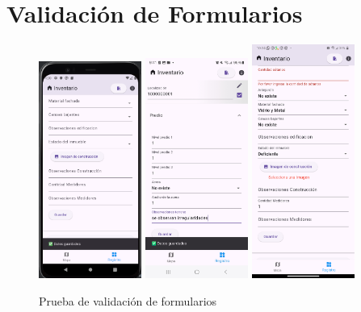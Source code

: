 \section{Validación de Formularios}
\begin{figure}[h]
    \includegraphics[width=0.3\textwidth]{Graphics/Capitulo 4/Pixel 4 [emulador]/4.4/1.png}
    \includegraphics[width=0.3\textwidth]{Graphics/Capitulo 4/Galaxy S23 Ultra Android/4.4/1.jpg}
    \includegraphics[width=0.3\textwidth]{Graphics/Capitulo 4/LG Android 13/4.4/2.png}
    \caption{Prueba de validación de formularios}
    \label{fig:figura22}
\end{figure}

